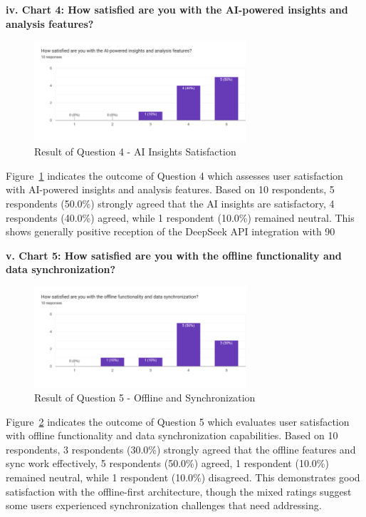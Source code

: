 \textbf{iv. Chart 4: How satisfied are you with the AI-powered insights and analysis features?}

\begin{figure}[H]
\centering
\includegraphics[width=0.7\textwidth]{files/imgs/survey/chart4_ai_insights.png}
\caption{Result of Question 4 - AI Insights Satisfaction}
\label{fig:chart4-ai}
\end{figure}

Figure~\ref{fig:chart4-ai} indicates the outcome of Question 4 which assesses user satisfaction with AI-powered insights and analysis features. Based on 10 respondents, 5 respondents (50.0\%) strongly agreed that the AI insights are satisfactory, 4 respondents (40.0\%) agreed, while 1 respondent (10.0\%) remained neutral. This shows generally positive reception of the DeepSeek API integration with 90%

\textbf{v. Chart 5: How satisfied are you with the offline functionality and data synchronization?}

\begin{figure}[H]
\centering
\includegraphics[width=0.7\textwidth]{files/imgs/survey/chart5_offline_sync.png}
\caption{Result of Question 5 - Offline and Synchronization}
\label{fig:chart5-offline}
\end{figure}

Figure~\ref{fig:chart5-offline} indicates the outcome of Question 5 which evaluates user satisfaction with offline functionality and data synchronization capabilities. Based on 10 respondents, 3 respondents (30.0\%) strongly agreed that the offline features and sync work effectively, 5 respondents (50.0\%) agreed, 1 respondent (10.0\%) remained neutral, while 1 respondent (10.0\%) disagreed. This demonstrates good satisfaction with the offline-first architecture, though the mixed ratings suggest some users experienced synchronization challenges that need addressing.

